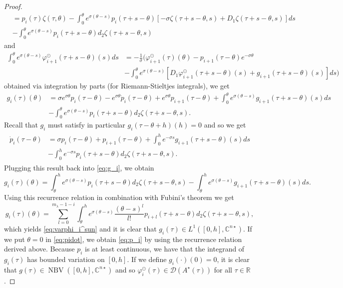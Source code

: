 \documentclass[english]{myarticle}
\DeclareMathOperator{\NBV}{NBV}
\begin{document}
\begin{sloppypar}
\begin{proof}
\begin{align*}
    &= p_i(\tau)\zeta(\tau,\theta) -\int_0^\theta e^{\sigma(\theta-s)}p_i(\tau+s-\theta)[-\sigma \zeta(\tau+s-\theta,s) + D_1\zeta(\tau+s-\theta,s)] ds \\
    &- \int_0^\theta e^{\sigma(\theta-s)}p_i(\tau+s-\theta)d_2\zeta(\tau+s-\theta,s)
\end{align*}
and
\begin{align*}
    \int_0^\theta e^{\sigma(\theta-s)}\varphi_{i+1}^\odot(\tau+s-\theta)(s) ds &= - \frac{1}{\sigma}\bigg(\varphi_{i+1}^\odot(\tau)(\theta) - p_{i+1}(\tau-\theta)e^{-\sigma \theta}\\
    &- \int_0^\theta e^{\sigma(\theta-s)}[D_1 \varphi_{i+1}^\odot(\tau+s-\theta)(s) + g_{i+1}(\tau+s-\theta)(s)]ds\bigg)
\end{align*}
obtained via integration by parts (for Riemann-Stieltjes integrals), we get
\begin{align} \label{eq:g_i}
    g_i(\tau)(\theta) &= \sigma e^{\sigma  \theta}p_i(\tau-\theta) - e^{\sigma  \theta}\dot{p}_i(\tau - \theta) + e^{\sigma \theta}p_{i+1}(\tau-\theta) + \int_0^\theta e^{\sigma (\theta-s)}g_{i+1}(\tau+s-\theta)(s) ds \nonumber \\
    &-\int_0^\theta e^{\sigma(\theta-s)} p_i(\tau+s-\theta) d_2\zeta(\tau+s-\theta,s).
\end{align}
Recall that $g_i$ must satisfy in particular $g_i(\tau - \theta +h)(h) = 0$ and so we get
\begin{align} 
\begin{split} \label{eq:pidot}
    \dot{p}_i(\tau-\theta) &= \sigma p_i(\tau-\theta) +p_{i+1}(\tau-\theta) + \int_0^h e^{-\sigma s}g_{i+1}(\tau+s-\theta)(s) ds \\
    &-\int_0^h e^{-\sigma s}p_{i}(\tau+s-\theta) d_2 \zeta(\tau+s-\theta,s).    
\end{split}
\end{align}
Plugging this result back into \eqref{eq:g_i}, we obtain
\begin{equation*}
    g_i(\tau)(\theta) = \int_\theta^h e^{\sigma(\theta-s)} p_i(\tau+s-\theta) d_2 \zeta(\tau+s-\theta,s) - \int_\theta^h e^{\sigma(\theta-s)}g_{i+1}(\tau+s-\theta)(s) ds.
\end{equation*}
Using this recurrence relation in combination with Fubini's theorem we get
\begin{equation*}
    g_i(\tau)(\theta) = \sum_{l = 0}^{m_\lambda - 1 - i} \int_\theta^h e^{\sigma(\theta - s)} \frac{(\theta -s)^l}{l!} p_{i+l}(\tau+s-\theta) d_2\zeta(\tau+s-\theta,s),
\end{equation*}
which yields \eqref{eq:varphi_i^sun} and it is clear that $g_i(\tau) \in L^1([0,h], \mathbb{C}^{n \star})$. If we put $\theta = 0$ in \eqref{eq:pidot}, we obtain \eqref{eq:p_i} by using the recurrence relation derived above. Because $p_i$ is at least continuous, we have that the integrand of $g_i(\tau)$ has bounded variation on $[0,h]$. If we define $g_i(\cdot)(0) = 0$, it is clear that $g(\tau) \in \NBV([0,h],\mathbb{C}^{n\star})$ and so $\varphi_i^\odot(\tau) \in \mathcal{D}(A^\star(\tau))$ for all $\tau \in \mathbb{R}$.
\end{proof}


\end{sloppypar}
\end{document}
